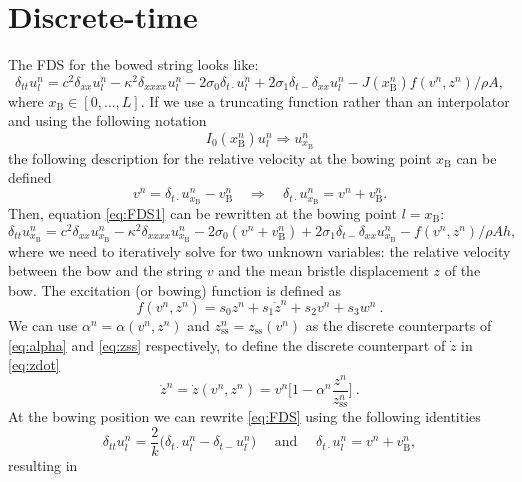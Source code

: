 \documentclass{article}
\begin{document}
\section{Discrete-time}
The FDS for the bowed string looks like:
\begin{equation}\label{eq:FDS1}
    \delta_{tt} u_l^n =c^2 \delta_{xx} u_l^n -\kappa^2\delta_{xxxx} u_l^n - 2\sigma_0\delta_{t\cdot} u_l^n
    + 2\sigma_1\delta_{t-}\delta_{xx}u_l^n - J(x_\text{B}^n)f(v^n, z^n)/\rho A,
\end{equation}
where $x_\text{B} \in [0,\hdots, L]$. If we use a truncating function rather than an interpolator and using the following notation
\begin{equation}
    I_0(x_\text{B}^n)u^n_l \Rightarrow u^n_{x_\text{B}}
\end{equation}
the following description for the relative velocity at the bowing point $x_\text{B}$ can be defined
\begin{equation}
    v^n = \delta_{t\cdot}u^n_{x_\text{B}} - v_\text{B}^n \quad \Rightarrow \quad \delta_{t\cdot}u^n_{x_\text{B}} = v^n + v_\text{B}^n.
\end{equation}
Then, equation \eqref{eq:FDS1} can be rewritten at the bowing point $l=x_\text{B}$:
\begin{equation}
\label{eq:FDS}
\delta_{tt} u_{x_\text{B}}^n =c^2 \delta_{xx} u_{x_\text{B}}^n -\kappa^2\delta_{xxxx} u_{x_\text{B}}^n - 2\sigma_0(v^n + v_\text{B}^n)
+ 2\sigma_1\delta_{t-}\delta_{xx}u_{x_\text{B}}^n - f(v^n, z^n)/\rho Ah,
\end{equation}
where we need to iteratively solve for two unknown variables: the relative velocity between the bow and the string $v$ and the mean bristle displacement $z$ of the bow.
The excitation (or bowing) function is defined as
\begin{equation}
    f(v^n, z^n) = s_0z^n + s_1 \dot{z}^n + s_2v^n + s_3w^n\ .
\end{equation}
We can use $\alpha^n = \alpha(v^n, z^n)$ and $z_\text{ss}^n = z_\text{ss}(v^n)$ as the discrete counterparts of \eqref{eq:alpha} and \eqref{eq:zss} respectively, to define the discrete counterpart of $\dot{z}$ in \eqref{eq:zdot}
\begin{equation}
    \dot{z}^n = \dot{z}(v^n,z^n)= v^n\bigg[1-\alpha^n\frac{z^n}{z_\text{ss}^n}\bigg]\ .
\end{equation}
At the bowing position we can rewrite \eqref{eq:FDS} using the following identities
\begin{equation}
    \delta_{tt}u_l^n = \frac{2}{k}\big(\delta_{t\cdot}u_l^n-\delta_{t-}u_l^n\big) \quad \text{ and } \quad \delta_{t\cdot}u_l^n = v^n + v_\text{B}^n,
\end{equation}
resulting in 
\end{document}
